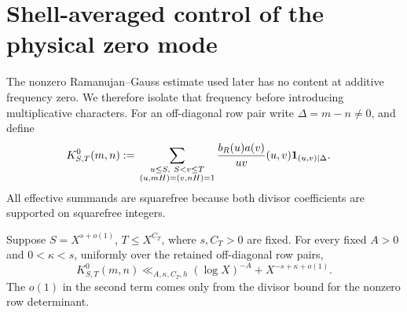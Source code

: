 \section{Shell-averaged control of the physical zero mode}
\label{sec:zero-shell}

The nonzero Ramanujan--Gauss estimate used later has no content at
additive frequency zero.  We therefore isolate that frequency before
introducing multiplicative characters.  For an off-diagonal row pair
write \(\Delta=m-n\ne0\), and define
\begin{align}
 K^0_{S,T}(m,n)
 :={}&
 \sum_{\substack{u\le S,\ S<v\le T\\
                  (u,mH)=(v,nH)=1}}
 \frac{b_R(u)a(v)}{uv}
 (u,v)\mathbf 1_{(u,v)\mid\Delta}.
 \label{eq:zero-kernel}
\end{align}
All effective summands are squarefree because both divisor
coefficients are supported on squarefree integers.

\begin{theorem}
\label{thm:pointwise-zero-shell}
Suppose \(S=X^{s+o(1)}\), \(T\le X^{C_T}\), where \(s,C_T>0\) are
fixed.  For every fixed \(A>0\) and \(0<\kappa<s\), uniformly over the
retained off-diagonal row pairs,
\begin{equation}
 \boxed{
 K^0_{S,T}(m,n)
 \ll_{A,\kappa,C_T,h}
 (\log X)^{-A}+X^{-s+\kappa+o(1)}.}
 \label{eq:pointwise-zero-shell}
\end{equation}
The \(o(1)\) in the second term comes only from the divisor bound for
the nonzero row determinant.
\end{theorem}

